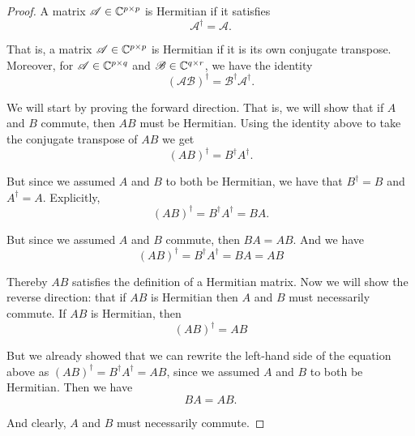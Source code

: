 \documentclass{article}
\begin{document}
\begin{proof}

A matrix $\mathscr{A} \in \mathbb{C}^{p \times p}$ is Hermitian if it satisfies
\begin{equation*}
    \mathscr{A}^{\dagger} = \mathscr{A}.
\end{equation*}

That is, a matrix $\mathscr{A} \in \mathbb{C}^{p \times p}$ is Hermitian if it is its own conjugate transpose. Moreover, for $\mathscr{A} \in \mathbb{C}^{p \times q}$ and $\mathscr{B} \in \mathbb{C}^{q \times r}$, we have the identity
\begin{equation*}
    \left( \mathscr{AB} \right)^{\dagger} = \mathscr{B}^{\dagger} \mathscr{A}^{\dagger}.
\end{equation*}

We will start by proving the forward direction. That is, we will show that if $A$ and $B$ commute, then $AB$ must be Hermitian. Using the identity above to take the conjugate transpose of $AB$ we get
\begin{equation*}
    \left( AB \right)^{\dagger} = B^{\dagger} A^{\dagger}.
\end{equation*}

But since we assumed $A$ and $B$ to both be Hermitian, we have that $B^{\dagger} = B$ and $A^{\dagger} = A$. Explicitly,
\begin{equation*}
    \left( AB \right)^{\dagger} = B^{\dagger} A^{\dagger} = BA.
\end{equation*}

But since we assumed $A$ and $B$ commute, then $BA = AB$. And we have
\begin{equation*}
    \left( AB \right)^{\dagger} = B^{\dagger} A^{\dagger} = BA = AB
\end{equation*}

Thereby $AB$ satisfies the definition of a Hermitian matrix. Now we will show the reverse direction: that if $AB$ is Hermitian then $A$ and $B$ must necessarily commute. If $AB$ is Hermitian, then
\begin{equation*}
    \left( AB \right)^{\dagger} = AB
\end{equation*}

But we already showed that we can rewrite the left-hand side of the equation above as $\left( AB \right)^{\dagger} = B^{\dagger} A^{\dagger} = AB$, since we assumed $A$ and $B$ to both be Hermitian. Then we have
\begin{equation*}
    BA = AB.
\end{equation*}

And clearly, $A$ and $B$ must necessarily commute.

\end{proof}
\end{document}
